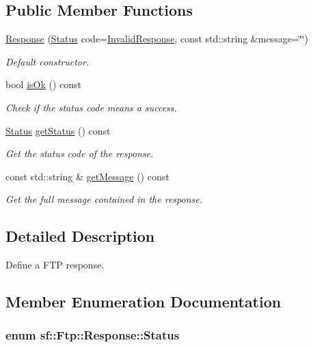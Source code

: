 \subsection*{Public Member Functions}
\begin{DoxyCompactItemize}
\item 
\hyperlink{classsf_1_1_ftp_1_1_response_af300fffd4862774102f978eb22f85d9b}{Response} (\hyperlink{classsf_1_1_ftp_1_1_response_af81738f06b6f571761696291276acb3b}{Status} code=\hyperlink{classsf_1_1_ftp_1_1_response_af81738f06b6f571761696291276acb3ba59e041e4ef186e8ae8d6035973fc46bd}{Invalid\+Response}, const std\+::string \&message=\char`\"{}\char`\"{})
\begin{DoxyCompactList}\small\item\em Default constructor. \end{DoxyCompactList}\item 
bool \hyperlink{classsf_1_1_ftp_1_1_response_a4dadbe0fe0a3ef2d571a017e1645e675}{is\+Ok} () const 
\begin{DoxyCompactList}\small\item\em Check if the status code means a success. \end{DoxyCompactList}\item 
\hyperlink{classsf_1_1_ftp_1_1_response_af81738f06b6f571761696291276acb3b}{Status} \hyperlink{classsf_1_1_ftp_1_1_response_ac7f937b3883d1c4fbc75c003a1786aaa}{get\+Status} () const 
\begin{DoxyCompactList}\small\item\em Get the status code of the response. \end{DoxyCompactList}\item 
const std\+::string \& \hyperlink{classsf_1_1_ftp_1_1_response_a0015675c528a4a84a671484b9e5499d6}{get\+Message} () const 
\begin{DoxyCompactList}\small\item\em Get the full message contained in the response. \end{DoxyCompactList}\end{DoxyCompactItemize}


\subsection{Detailed Description}
Define a F\+T\+P response. 

\subsection{Member Enumeration Documentation}
\hypertarget{classsf_1_1_ftp_1_1_response_af81738f06b6f571761696291276acb3b}{
\subsubsection[{Status}]{\setlength{\rightskip}{0pt plus 5cm}enum {\bf sf\+::\+Ftp\+::\+Response\+::\+Status}}}\label{classsf_1_1_ftp_1_1_response_af81738f06b6f571761696291276acb3b}


